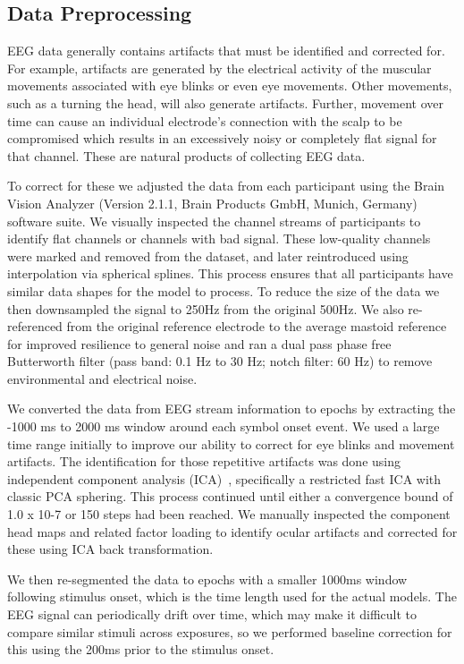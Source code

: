 \subsection{Data Preprocessing}
\label{sec:preprocessing}

EEG data generally contains artifacts that must be identified and corrected 
for. For example, artifacts are generated by the electrical activity of the 
muscular movements associated with eye blinks or even eye movements. Other 
movements, such as a turning the head, will also generate artifacts. Further, 
movement over time can cause an individual electrode's connection with the 
scalp to be compromised which results in an excessively noisy or completely 
flat signal for that channel. These are natural products of collecting EEG 
data. 

To correct for these we adjusted the data from each participant using the Brain 
Vision Analyzer (Version 2.1.1, Brain Products GmbH, Munich, Germany) software 
suite. We visually inspected the channel streams of participants to identify 
flat channels or channels with bad signal. These low-quality channels were 
marked and removed from the dataset, and later reintroduced using interpolation 
via spherical splines. This process ensures that all participants have similar 
data shapes for the model to process. To reduce the size of the data we then 
downsampled the signal to 250Hz from the original 500Hz. We also re-referenced 
from the original reference electrode to the average mastoid reference for 
improved resilience to general noise and ran a dual pass phase free Butterworth 
filter (pass band: 0.1 Hz to 30 Hz; notch filter: 60 Hz) to remove 
environmental and electrical noise.

We converted the data from EEG stream information to epochs by extracting the 
-1000 ms to 2000 ms window around each symbol onset event. We used a large time 
range initially to improve our ability to correct for eye blinks and movement 
artifacts. The identification for those repetitive artifacts was done using 
independent component analysis (ICA)~\cite{luck2014introduction}, specifically 
a restricted fast ICA with classic PCA sphering. This process continued until 
either a convergence bound of 1.0 x 10-7 or 150 steps had been reached. We 
manually inspected the component head maps and related factor loading to 
identify ocular artifacts and corrected for these using ICA back 
transformation. 

We then re-segmented the data to epochs with a smaller 1000ms window following 
stimulus onset, which is the time length used for the actual models.  The EEG 
signal can periodically drift over time, which may make it difficult to compare 
similar stimuli across exposures, so we performed baseline correction for this 
using the 200ms prior to the stimulus onset. 

